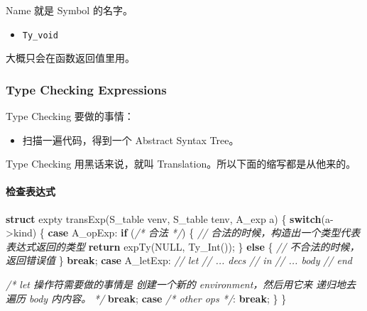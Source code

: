 \documentclass[
]{article}
\newenvironment{Shaded}{}{}
\newcommand{\CommentTok}[1]{\textcolor[rgb]{0.38,0.63,0.69}{\textit{#1}}}
\newcommand{\ControlFlowTok}[1]{\textcolor[rgb]{0.00,0.44,0.13}{\textbf{#1}}}
\newcommand{\KeywordTok}[1]{\textcolor[rgb]{0.00,0.44,0.13}{\textbf{#1}}}
\newcommand{\NormalTok}[1]{#1}
\begin{document}
Name 就是 Symbol 的名字。

\begin{itemize}
\item
  \texttt{Ty\_void}
\end{itemize}

大概只会在函数返回值里用。

\hypertarget{header-n33}{%
\subsubsection{Type Checking Expressions}\label{header-n33}}

Type Checking 要做的事情：

\begin{itemize}
\item
  扫描一遍代码，得到一个 Abstract Syntax Tree。
\end{itemize}

Type Checking 用黑话来说，就叫 Translation。所以下面的缩写都是从他来的。

\hypertarget{header-n39}{%
\paragraph{检查表达式}\label{header-n39}}

\begin{Shaded}
\begin{Highlighting}[]
\KeywordTok{struct}\NormalTok{ expty transExp(S_table venv, S_table tenv, A_exp a) \{}
    \ControlFlowTok{switch}\NormalTok{(a->kind) \{}
        \ControlFlowTok{case}\NormalTok{ A_opExp:}
            \ControlFlowTok{if}\NormalTok{ (}\CommentTok{/* 合法 */}\NormalTok{) \{}
                \CommentTok{// 合法的时候，构造出一个类型代表表达式返回的类型}
                \ControlFlowTok{return}\NormalTok{ expTy(NULL, Ty_Int());}
\NormalTok{            \} }\ControlFlowTok{else}\NormalTok{ \{}
                \CommentTok{// 不合法的时候，返回错误值}
\NormalTok{            \}}
            \ControlFlowTok{break}\NormalTok{;}
        \ControlFlowTok{case}\NormalTok{ A_letExp:}
            \CommentTok{// let}
            \CommentTok{//  ... decs}
            \CommentTok{// in}
            \CommentTok{//  ... body}
            \CommentTok{// end}
            
            \CommentTok{/* let 操作符需要做的事情是}
\CommentTok{               创建一个新的 environment，然后用它来}
\CommentTok{               递归地去遍历 body 内内容。}
\CommentTok{            */}
            \ControlFlowTok{break}\NormalTok{;}
        \ControlFlowTok{case} \CommentTok{/* other ops */}\NormalTok{:}
            \ControlFlowTok{break}\NormalTok{;}
\NormalTok{    \}}
\NormalTok{\}}
\end{Highlighting}
\end{Shaded}
\end{document}
